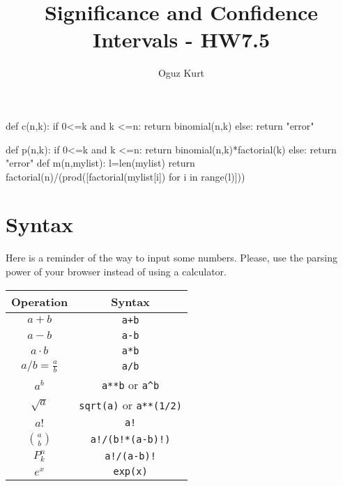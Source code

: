 \documentclass{ximera}
\title{Significance and Confidence Intervals - HW7.5}
\author{Oguz Kurt}
\begin{document}
\begin{abstract}
\empty
\end{abstract}
\maketitle
\begin{sagesilent}
def c(n,k):
    if 0<=k and k <=n:
        return binomial(n,k)
    else:
        return "error"

def p(n,k):
    if 0<=k and k <=n:
        return binomial(n,k)*factorial(k)
    else:
        return "error"
def m(n,mylist):
    l=len(mylist)
    return factorial(n)/(prod([factorial(mylist[i]) for i in range(l)]))
\end{sagesilent}



\section*{Syntax}
Here is a reminder of the way to input some numbers. Please, use the parsing power of your browser instead of using a calculator.

\hspace{0.5cm}


\begin{tabular}{c|c}
Operation & Syntax  
\\
\hline
$a+b$ & {\color{red} \verb!a+b!} 
\\
\hline
$a- b$ & {\color{red} \verb!a-b!} 
\\
\hline
$a\cdot b$ & {\color{red} \verb!a*b! } 
\\
\hline
$a/b=\frac{a}{b}$ & {\color{red} \verb!a/b!}
\\
\hline
$a^b$ & {\color{red} \verb|a**b| or \verb|a^b|} 
\\
\hline
$\sqrt{a}$ & {\color{red} \verb|sqrt(a)| or \verb|a**(1/2)|} 
\\
\hline
$a!$ & {\color{red} \verb|a!|} 
\\
\hline
$\binom{a}{b}$ & {\color{red} \verb|a!/(b!*(a-b)!)|}
\\
\hline
$P_k^n$ & {\color{red} \verb|a!/(a-b)!|}
\\
\hline
$e^x$ & {\color{red} \verb|exp(x)|}
\\
\end{tabular}
\end{document}
